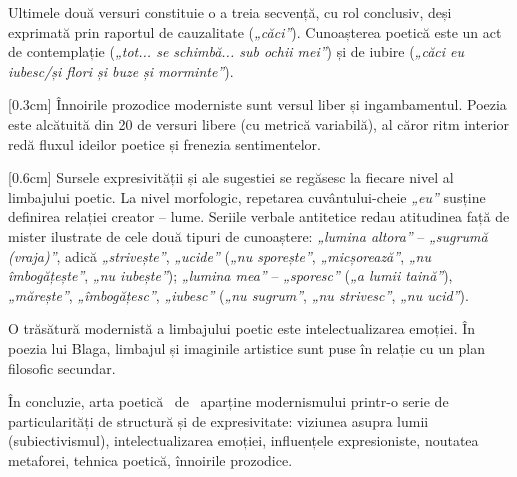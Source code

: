 Ultimele două versuri constituie o a treia secvență, cu rol conclusiv, deși exprimată prin raportul de cauzalitate (\textit{„căci”}). Cunoașterea poetică este un act de contemplație (\textit{„tot... se schimbă... sub ochii mei”}) și de iubire (\textit{„căci eu iubesc/și flori și buze și morminte”}).

[0.3cm]
Înnoirile prozodice moderniste sunt versul liber și ingambamentul. Poezia este alcătuită din 20 de versuri libere (cu metrică variabilă), al căror ritm interior redă fluxul ideilor poetice și frenezia sentimentelor.

[0.6cm]
Sursele expresivității și ale sugestiei se regăsesc la fiecare nivel al limbajului poetic. La nivel morfologic, repetarea cuvântului-cheie \textit{„eu”} susține definirea relației creator -- lume. Seriile verbale antitetice redau atitudinea față de mister ilustrate de cele două tipuri de cunoaștere: \textit{„lumina altora”} -- \textit{„sugrumă (vraja)”}, adică \textit{„strivește”}, \textit{„ucide”} (\textit{„nu sporește”}, \textit{„micșorează”}, \textit{„nu îmbogățește”}, \textit{„nu iubește”}); \textit{„lumina mea”} -- \textit{„sporesc”} (\textit{„a lumii taină”}), \textit{„mărește”}, \textit{„îmbogățesc”}, \textit{„iubesc”} (\textit{„nu sugrum”}, \textit{„nu strivesc”}, \textit{„nu ucid”}).

O trăsătură modernistă a limbajului poetic este intelectualizarea emoției. În poezia lui Blaga, limbajul și imaginile artistice sunt puse în relație cu un plan filosofic secundar.

În concluzie, arta poetică \operatitle\ de \operaauthor\ aparține modernismului printr-o serie de particularități de structură și de expresivitate: viziunea asupra lumii (subiectivismul), intelectualizarea emoției, influențele expresioniste, noutatea metaforei, tehnica poetică, înnoirile prozodice.
